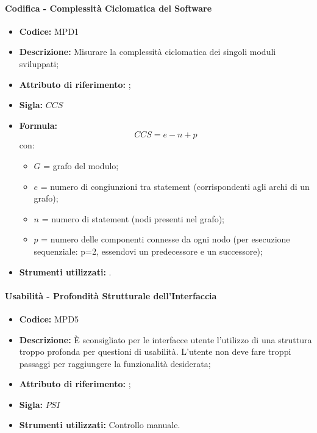 \paragraph{Codifica - Complessità Ciclomatica del Software} 
    \begin{itemize}
    \item \textbf{Codice:} MPD1
    \item \textbf{Descrizione:} Misurare la complessità ciclomatica dei singoli moduli sviluppati;
    \item \textbf{Attributo di riferimento:} ;
    \item \textbf{Sigla:} $CCS$
    \item \textbf{Formula:} $$CCS = e - n + p$$
    con:
    \begin{itemize}
        \item $G$ = grafo del modulo;
        \item $e$ = numero di congiunzioni tra statement (corrispondenti agli archi di un grafo);
        \item $n$ = numero di statement (nodi presenti nel grafo);
        \item $p$ = numero delle componenti connesse da ogni nodo (per esecuzione sequenziale: p=2, essendovi un predecessore e un successore);
    \end{itemize}
    \item \textbf{Strumenti utilizzati:} .
\end{itemize}

\paragraph{Usabilità - Profondità Strutturale dell'Interfaccia}
\begin{itemize}
    \item \textbf{Codice:} MPD5
    \item \textbf{Descrizione:} È sconsigliato per le interfacce utente l'utilizzo di una struttura troppo profonda per questioni di usabilità. L'utente non deve fare troppi passaggi per raggiungere la funzionalità desiderata;
    \item \textbf{Attributo di riferimento:} ;
    \item \textbf{Sigla:} $PSI$
    \item \textbf{Strumenti utilizzati:} Controllo manuale.
\end{itemize}

